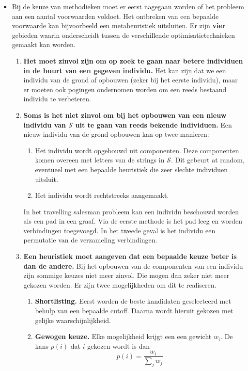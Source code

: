 \begin{itemize}
    \item Bij de keuze van methodieken moet er eerst nagegaan worden of het probleem aan een aantal voorwaarden voldoet. Het ontbreken van een bepaalde voorwaarde kan bijvoorbeeld een metaheuristiek uitsluiten. Er zijn \textbf{vier} gebieden waarin onderscheidt tussen de verschillende optimisatietechnieken gemaakt kan worden.
    \begin{enumerate}
        \item \textbf{Het moet zinvol zijn om op zoek te gaan naar betere individuen in de buurt van een gegeven individu.} Het kan zijn dat we een individu van de grond af opbouwen (zeker bij het eerste individu), maar er moeten ook pogingen ondernomen worden om een reeds bestaand individu te verbeteren.
        \item \textbf{Soms is het niet zinvol om bij het opbouwen van een nieuw individu van $\mathcal{S}$ uit te gaan van reeds bekende individuen.} Een nieuw individu van de grond opbouwen kan op twee manieren:
        \begin{enumerate}
            \item Het individu wordt opgebouwd uit componenten. Deze componenten komen overeen met letters van de strings in $\mathcal{S}$. Dit gebeurt at random, eventueel met een bepaalde heuristiek die zeer slechte individuen uitsluit.
            \item Het individu wordt rechtstreeks aangemaakt.
        \end{enumerate}

        In het travelling salesman probleem kan een individu beschouwd worden als een pad in een graaf. Via de eerste methode is het pad leeg en worden verbindingen toegevoegd. In het tweede geval is het individu een permutatie van de verzameling verbindingen.

        \item \textbf{Een heuristiek moet aangeven dat een bepaalde keuze beter is dan de andere.} Bij het opbouwen van de componenten van een individu zijn sommige keuzes niet meer zinvol. Die mogen dan zeker niet meer gekozen worden. Er zijn twee mogelijkheden om dit te realiseren.
        \begin{enumerate}
            \item \textbf{Shortlisting.} Eerst worden de beste kandidaten geselecteerd met behulp van een bepaalde cutoff. Daarna wordt hieruit gekozen met gelijke waarschijnlijkheid.
            \item \textbf{Gewogen keuze.} Elke mogelijkheid krijgt een een gewicht $w_i$. De kans $p(i)$ dat $i$ gekozen wordt is dan
            $$p(i) = \frac{w_i}{\sum_j w_j}$$
        \end{enumerate}


\end{enumerate}
\end{itemize}
